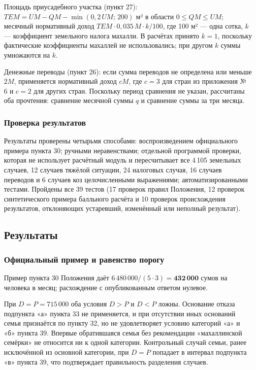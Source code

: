 \documentclass[14pt,a4paper]{extarticle}
\begin{document}
Площадь приусадебного участка (пункт 27): $TEM=UM-QM-\min(0{,}2\,UM;\,200)$ м² в области $0\le QM\le UM$; месячный нормативный доход $TEM\cdot0{,}035\,M\cdot k/100$, где 100 м² — одна сотка, $k$ — коэффициент земельного налога махалли. В расчётах принято $k=1$, поскольку фактические коэффициенты махаллей не использовались; при другом $k$ суммы умножаются на $k$.

Денежные переводы (пункт 26): если сумма переводов не определена или меньше $2M$, применяется нормативный доход $cM$, где $c=3$ для стран из приложения № 6 и $c=2$ для других стран. Поскольку период сравнения не указан, рассчитаны оба прочтения: сравнение месячной суммы $q$ и сравнение суммы за три месяца.

\subsubsection{Проверка результатов}
Результаты проверены четырьмя способами: воспроизведением официального примера пункта 30; ручными неравенствами; отдельной программой проверки, которая не использует расчётный модуль и пересчитывает все 4\,105 земельных случаев, 12 случаев тяжёлой ситуации, 24 налоговых случая, 16 случаев переводов и 6 случаев коз целочисленными выражениями; автоматизированными тестами. Пройдены все 39 тестов (17 проверок правил Положения, 12 проверок синтетического примера балльного расчёта и 10 проверок происхождения результатов, отклоняющих устаревший, изменённый или неполный результат).

\subsection{Результаты}
\subsubsection{Официальный пример и равенство порогу}\label{res:eq}
Пример пункта 30 Положения даёт $6\,480\,000/(5\cdot3)=\mathbf{432\,000}$ сумов на человека в месяц; расхождение с опубликованным ответом нулевое.

При $D=P=715\,000$ оба условия $D>P$ и $D<P$ ложны. Основание отказа подпункта «а» пункта 33 не применяется, и при отсутствии иных оснований семья признаётся по пункту 32, но не удовлетворяет условию категорий «а» и «б» пункта 39. Впервые обратившаяся семья без рекомендации «махаллинской семёрки» не относится ни к одной категории. Контрольный случай семьи, ранее исключённой из основной категории, при $D=P$ попадает в интервал подпункта «в» пункта 39, что подтверждает правильность разделения случаев.
\end{document}
